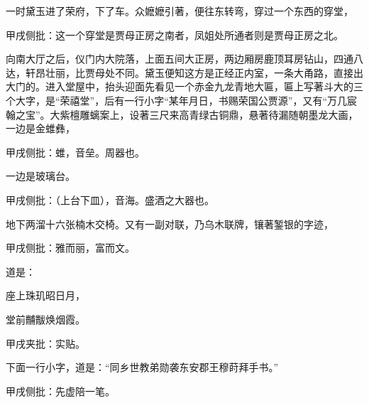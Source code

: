 \begin{parag}
    一时黛玉进了荣府，下了车。众嬷嬷引著，便往东转弯，穿过一个东西的穿堂，\begin{note}甲戌侧批：这一个穿堂是贾母正房之南者，凤姐处所通者则是贾母正房之北。\end{note}向南大厅之后，仪门内大院落，上面五间大正房，两边厢房鹿顶耳房钻山，四通八达，轩昂壮丽，比贾母处不同。黛玉便知这方是正经正内室，一条大甬路，直接出大门的。进入堂屋中，抬头迎面先看见一个赤金九龙青地大匾，匾上写著斗大的三个大字，是“荣禧堂”，后有一行小字“某年月日，书赐荣国公贾源”，又有“万几宸翰之宝”。大紫檀雕螭案上，设著三尺来高青绿古铜鼎，悬著待漏随朝墨龙大画，一边是金蜼彝，\begin{note}甲戌侧批：蜼，音垒。周器也。\end{note}一边是玻璃台。\begin{note}甲戌侧批：（上台下皿），音海。盛酒之大器也。\end{note}地下两溜十六张楠木交椅。又有一副对联，乃乌木联牌，镶著錾银的字迹，\begin{note}甲戌侧批：雅而丽，富而文。\end{note}道是：
\end{parag}


\begin{poem}
    \begin{pl} 座上珠玑昭日月， \end{pl}

    \begin{pl}堂前黼黻焕烟霞。\end{pl}\begin{note}甲戌夹批：实贴。\end{note}
\end{poem}


\begin{parag}
    下面一行小字，道是：“同乡世教弟勋袭东安郡王穆莳拜手书。”\begin{note}甲戌侧批：先虚陪一笔。\end{note}
\end{parag}


